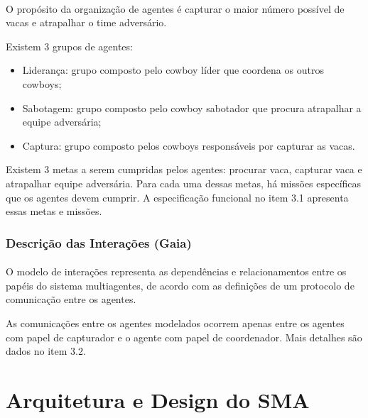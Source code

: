 \documentclass{llncs}
\begin{document}
\paragraph{ }
O propósito da organização de agentes é capturar o maior número possível de vacas e atrapalhar o time adversário.

Existem 3 grupos de agentes:

\begin{itemize}
\item Liderança: grupo composto pelo cowboy líder que coordena os outros cowboys;
\item Sabotagem: grupo composto pelo cowboy sabotador que procura atrapalhar a equipe adversária;
\item Captura: grupo composto pelos cowboys responsáveis por capturar as vacas.
\end{itemize}

Existem 3 metas a serem cumpridas pelos agentes: procurar vaca, capturar vaca e atrapalhar equipe adversária. Para cada uma dessas metas, há missões específicas que os agentes devem cumprir. A especificação funcional no item 3.1 apresenta essas metas e missões.


\subsubsection{Descrição das Interações (Gaia)}

\paragraph{ }
O modelo de interações representa as dependências e relacionamentos entre os papéis do sistema multiagentes, de acordo com as definições de um protocolo de comunicação entre os agentes.

As comunicações entre os agentes modelados ocorrem apenas entre os agentes com papel de capturador e o agente com papel de coordenador. Mais detalhes são dados no item 3.2.


\section{Arquitetura e Design do SMA}


\end{document}
